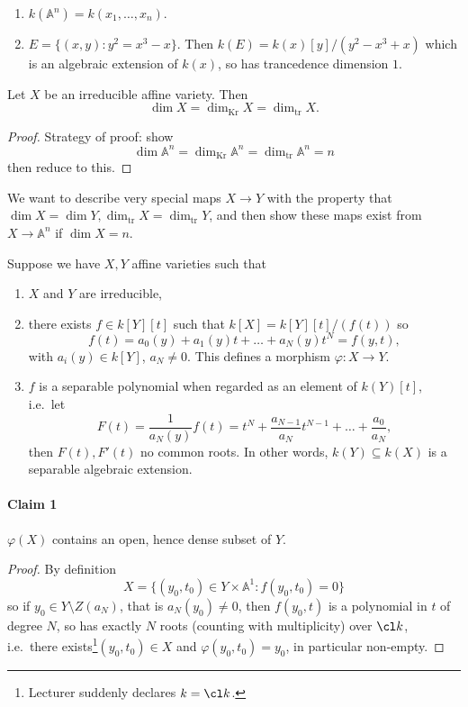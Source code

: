 \documentclass[a4paper]{article}
\renewcommand{\A}{\mathbb{A}}
\begin{document}
\begin{eg}\leavevmode
  \begin{enumerate}
  \item \(k(\A^n) = k(x_1, \dots, x_n)\).
  \item \(E = \{(x, y): y^2 = x^3 - x\}\). Then \(k(E) = k(x)[y]/(y^2 - x^3 + x)\) which is an algebraic extension of \(k(x)\), so has trancedence dimension \(1\).
  \end{enumerate}
\end{eg}

\begin{theorem}
  Let \(X\) be an irreducible affine variety. Then
  \[
    \dim X = \dim_{\text{Kr}} X = \dim_{\text{tr}} X.
  \]
\end{theorem}

\begin{proof}
  Strategy of proof: show
  \[
    \dim \A^n = \dim_{\text{Kr}} \A^n = \dim_{\text{tr}} \A^n = n
  \]
  then reduce to this.
\end{proof}

We want to describe very special maps \(X \to Y\) with the property that \(\dim X = \dim Y, \dim_{\text{tr}} X = \dim_{\text{tr}} Y\), and then show these maps exist from \(X \to \A^n\) if \(\dim X = n\).

Suppose we have \(X, Y\) affine varieties such that
\begin{enumerate}
\item \(X\) and \(Y\) are irreducible,
\item there exists \(f \in k[Y][t]\) such that \(k[X] = k[Y][t]/(f(t))\) so
  \[
    f(t) = a_0(y) + a_1(y)t + \dots + a_N(y)t^N = f(y, t),
  \]
  with \(a_i(y) \in k[Y]\), \(a_N \neq 0\). This defines a morphism \(\varphi: X \to Y\).
\item \(f\) is a separable polynomial when regarded as an element of \(k(Y)[t]\), i.e.\ let
\[
  F(t) = \frac{1}{a_N(y)} f(t) = t^N + \frac{a_{N - 1}}{a_N} t^{N - 1} + \dots + \frac{a_0}{a_N},
\]
then \(F(t), F'(t)\) no common roots. In other words, \(k(Y) \subseteq k(X)\) is a separable algebraic extension.
\end{enumerate}

\paragraph{Claim 1}

\(\varphi(X)\) contains an open, hence dense subset of \(Y\).

\begin{proof}
  By definition
  \[
    X = \{(y_0, t_0) \in Y \times \A^1: f(y_0, t_0) = 0\}
  \]
  so if \(y_0 \in Y \setminus Z(a_N)\), that is \(a_N(y_0) \neq 0\), then \(f(y_0, t)\) is a polynomial in \(t\) of degree \(N\), so has exactly \(N\) roots (counting with multiplicity) over \(\cl k\), i.e.\ there exists\footnote{Lecturer suddenly declares \(k = \cl k\).}\((y_0, t_0) \in X\) and \(\varphi(y_0, t_0) = y_0\), in particular non-empty.
\end{proof}
\end{document}
